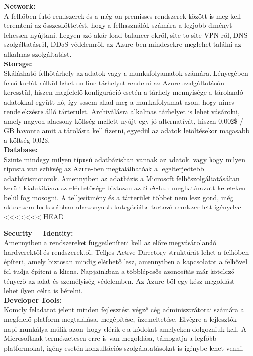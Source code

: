 \documentclass[12pt,oneside,justify,table]{book}
\begin{document}
\noindent \textbf{Network:}\\
A felhőben futó rendszerek és a még on-premisses rendszerek között is meg kell teremteni az összesköttetést, hogy a felhasználók számára a legjobb élményt lehessen nyújtani. Legyen szó akár load balancer-ekről, site-to-site VPN-ről, DNS szolgáltatásról, DDoS védelemről, az Azure-ben mindezekre meglehet találni az alkalmas szolgáltatást.\\

\noindent \textbf{Storage:}\\
Skálázható felhőtárhely az adatok vagy a munkafolyamatok számára. Lényegében felső korlát nélkül lehet on-line tárhelyet rendelni az Azure szolgáltatásán keresztül, hiszen megfelelő konfiguráció esetén a tárhely mennyisége a tárolandó adatokkal együtt nő, így sosem akad meg a munkafolyamat azon, hogy nincs rendelekzésre álló tárterület. Archiválásra alkalmas tárhelyet is lehet vásárolni, amely nagyon alacsony költség mellett nyújt egy jó alternatívát, hiszen 0,002\$ / GB havonta amit a tárolásra kell fizetni, egyedül az adatok letöltésekor magasabb a költség 0,02\$. \\

\noindent \textbf{Database:}\\
Szinte mindegy milyen típusú adatbázisban vannak az adatok, vagy hogy milyen típusra van szükség az Azure-ben megtalálhatóak a legelterjedtebb adatbázismotorok. Amennyiben az adatbázis a Microsoft felhőszolgáltatásában került kialakításra az elérhetősége biztosan az SLA-ban meghatározott kereteken belül fog mozogni. A telljesítmény és a tárterület többet nem lesz gond, még akkor sem ha korábban alacsonyabb kategóriába tartozó rendszer lett igényelve. \\
<<<<<<< HEAD

\noindent \textbf{Security + Identity:}\\
Amennyiben a rendszereket függetleníteni kell az előre megvásárolandó hardverektől és rendszerektől. Telljes Active Directory struktúrát lehet a felhőben építeni, amely biztosan mindig elérhető lesz, amennyiben a kapcsolatot a felhővel fel tudja építeni a kliens. Napjainkban a többlépcsős azonosítás már kötelező tényező az adat és személyiség védelemben. Az Azure-ből egy kész megoldást lehet ilyen célra is bérelni. \\

\noindent \textbf{Developer Tools:}\\
Komoly feladatot jelent minden fejlesztést végző cég adminisztrátorai számára a megfelelő platform megtalálása, megépítése, üzemeltetése. Elvégre a fejlesztők napi munkálya múlik azon, hogy elérik-e a kódokat amelyeken dolgozniuk kell. A Microsoftnak természetesen erre is van megoldása, támogatja a legfőbb platformokat, igény esetén konzultációs szolgálatatásokat is igénybe lehet venni. \\
\end{document}

